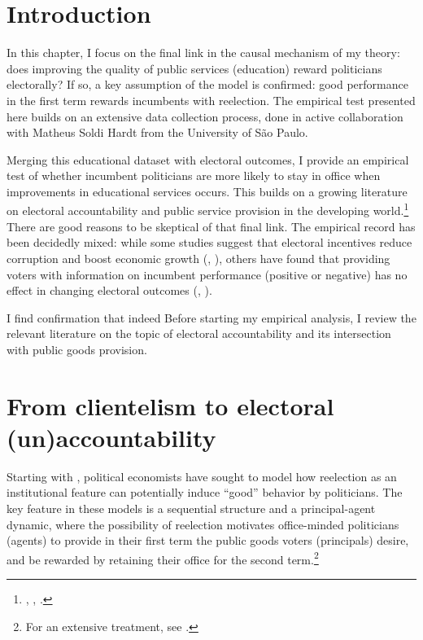 \documentclass[12pt,]{book}
\let\rmarkdownfootnote\footnote%
\def\footnote{\protect\rmarkdownfootnote}
\begin{document}
\hypertarget{introduction-2}{%
\section{Introduction}\label{introduction-2}}

In this chapter, I focus on the final link in the causal mechanism of my theory: does improving the quality of public services (education) reward politicians electorally? If so, a key assumption of the model is confirmed: good performance in the first term rewards incumbents with reelection. The empirical test presented here builds on an extensive data collection process, done in active collaboration with Matheus Soldi Hardt from the University of São Paulo.

Merging this educational dataset with electoral outcomes, I provide an empirical test of whether incumbent politicians are more likely to stay in office when improvements in educational services occurs. This builds on a growing literature on electoral accountability and public service provision in the developing world.\footnote{\citet{boas_electoral_2019}, \citet{boas_norms_2019}, \citet{ashworth_electoral_2012}.} There are good reasons to be skeptical of that final link. The empirical record has been decidedly mixed: while some studies suggest that electoral incentives reduce corruption and boost economic growth (\citet{ferraz_electoral_2011}, \citet{besley_does_1995}), others have found that providing voters with information on incumbent performance (positive or negative) has no effect in changing electoral outcomes (\citet{boas_electoral_2019}, \citet{boas_norms_2019}).

I find confirmation that indeed
Before starting my empirical analysis, I review the relevant literature on the topic of electoral accountability and its intersection with public goods provision.

\hypertarget{from-clientelism-to-electoral-unaccountability}{%
\section{From clientelism to electoral (un)accountability}\label{from-clientelism-to-electoral-unaccountability}}

Starting with \citet{barro_control_1973}, political economists have sought to model how reelection as an institutional feature can potentially induce ``good'' behavior by politicians. The key feature in these models is a sequential structure and a principal-agent dynamic, where the possibility of reelection motivates office-minded politicians (agents) to provide in their first term the public goods voters (principals) desire, and be rewarded by retaining their office for the second term.\footnote{For an extensive treatment, see \citet{besley_principled_2006}.}
\end{document}
